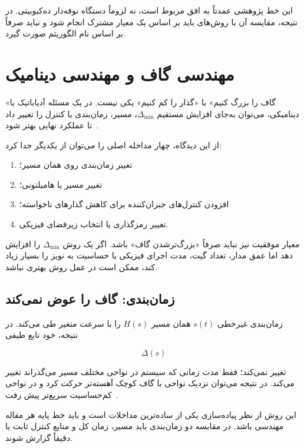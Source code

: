 این خط پژوهشی عمدتاً به افق  مربوط است، نه لزوماً دستگاه نوفه‌دار ده‌کیوبیتی.
در نتیجه، مقایسه آن با روش‌های  باید بر اساس یک معیار مشترک انجام شود و نباید صرفاً بر اساس نام الگوریتم صورت گیرد.

\section{مهندسی گاف و مهندسی دینامیک}
\label{sec:gap-eng}

«گاف را بزرگ کنیم» با «گذار را کم کنیم» یکی نیست.
در یک مسئله آدیاباتیک یا دینامیکی، می‌توان به‌جای افزایش مستقیم $\Delta_{\min}$، مسیر، زمان‌بندی یا کنترل را تغییر داد تا عملکرد نهایی بهتر شود~\cite{AlbashLidar2018,GapSels2017,Gueneau2025CD}.

از این دیدگاه، چهار مداخله اصلی را می‌توان از یکدیگر جدا کرد:

\begin{enumerate}
	\item تغییر زمان‌بندی روی همان مسیر؛
	\item تغییر مسیر یا هامیلتونی؛
	\item افزودن کنترل‌های جبران‌کننده برای کاهش گذارهای ناخواسته؛
	\item تغییر رمزگذاری یا انتخاب زیرفضای فیزیکی.
\end{enumerate}

معیار موفقیت نیز نباید صرفاً «بزرگ‌ترشدن گاف» باشد.
اگر یک روش $\Delta_{\min}$ را افزایش دهد اما عمق مدار، تعداد گیت، مدت اجرای فیزیکی یا حساسیت به نویز را بسیار زیاد کند، ممکن است در عمل روش بهتری نباشد.

\subsection{زمان‌بندی: گاف را عوض نمی‌کند}

زمان‌بندی غیرخطی $s(t)$ همان مسیر $H(s)$ را با سرعت متغیر طی می‌کند.
در نتیجه، خود تابع طیفی

\begin{equation}
	\Delta(s)
\end{equation}

تغییر نمی‌کند؛ فقط مدت زمانی که سیستم در نواحی مختلف مسیر می‌گذراند تغییر می‌کند.
در نتیجه می‌توان نزدیک نواحی با گاف کوچک آهسته‌تر حرکت کرد و در نواحی کم‌حساسیت سریع‌تر پیش رفت~\cite{GapRoland2002}.

این روش از نظر پیاده‌سازی یکی از ساده‌ترین مداخلات است و باید خط پایه هر مقاله مهندسی باشد.
در مقایسه دو زمان‌بندی باید مسیر، زمان کل و منابع کنترل ثابت یا دقیقاً گزارش شوند.

